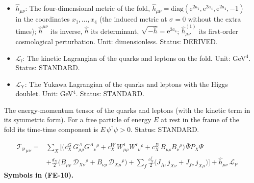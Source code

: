 \documentclass[
  10pt,
]{article}
\begin{document}
\begin{itemize}
  \(D_M\bar\Psi = \partial_M\bar\Psi - \bar\Psi\Omega_M\)); on the
  fields of the fold the gauge and spin covariant derivative \(D_\mu\)
  (the partial derivative plus the spin connection of the fold and the
  gauge fields times their couplings and generators);
  \(D^\mu = \hat h^{\mu\nu}D_\nu\); on an adjoint field
  \((D_\mu X)^A = \partial_\mu X^A + g_3f^{ABC}G^B_\mu X^C\) (likewise
  for \(SU(2)\) with \(g_2\epsilon^{IJK}\)). Unit: 1/length. Status:
  STANDARD.
\item
  \(\hat h_{\mu\nu}\): The four-dimensional metric of the fold,
  \(\hat h_{\mu\nu} = \mathrm{diag}(\mathrm{e}^{2a_4}, \mathrm{e}^{2a_4}, \mathrm{e}^{2a_4}, -1)\)
  in the coordinates \(x_1, \dots, x_4\) (the induced metric at
  \(\sigma = 0\) without the extra times); \(\hat h^{\mu\nu}\) its
  inverse, \(\hat h\) its determinant,
  \(\sqrt{-\hat h} = \mathrm{e}^{3a_4}\); \(\hat h^{(1)}_{\mu\nu}\) its
  first-order cosmological perturbation. Unit: dimensionless. Status:
  DERIVED.
\item
  \(\mathcal{L}_{\mathrm{f}}\): The kinetic Lagrangian of the quarks and
  leptons on the fold. Unit: GeV\(^4\). Status: STANDARD.
\item
  \(\mathcal{L}_{\mathrm{Y}}\): The Yukawa Lagrangian of the quarks and
  leptons with the Higgs doublet. Unit: GeV\(^4\). Status: STANDARD.
\end{itemize}

The energy-momentum tensor of the quarks and leptons (with the kinetic
term in its symmetric form). For a free particle of energy \(E\) at rest
in the frame of the fold its time-time component is
\(E\,\psi^\dagger\psi > 0\). Status: STANDARD.

\[
\begin{aligned}
{\mathcal{T}_{\mathrm{P}}}_{\mu\nu} = {}&\sum_X\Big[\big(c^{G}_X\,G^A_{\mu\rho}G^A{}_\nu{}^\rho + c^{W}_X\,W^I_{\mu\rho}W^I{}_\nu{}^\rho
 + c^{B}_X\,B_{\mu\rho}B_\nu{}^\rho\big)\,\bar\Psi P_X\Psi\\
&+ \frac{d_X}{2}\big(B_{\mu\rho}\,\mathcal{D}_{X\nu}{}^\rho + B_{\nu\rho}\,\mathcal{D}_{X\mu}{}^\rho\big)
 + \sum_f\frac{c^{f}_X}{2}\big(J_{f\mu}\,j_{X\nu} + J_{f\nu}\,j_{X\mu}\big)\Big] + \hat h_{\mu\nu}\,\mathcal{L}_{\mathrm{P}}
\end{aligned} \tag{FE-10}
\] \textbf{Symbols in (FE-10).}
\end{document}
